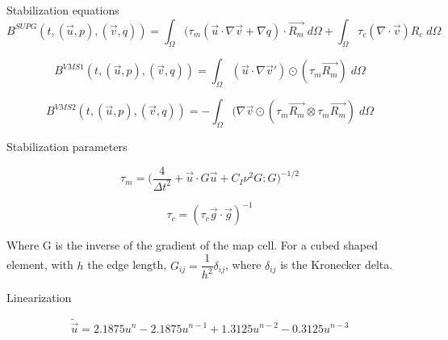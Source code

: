 \begin{frame}{Stabilization equations}
\begin{equation}
B^{SUPG}(t, (\Vec{u},p), (\Vec{v},q))  =     \int_\Omega(\tau_m(\Vec{u}\cdot\nabla \Vec{v} +\nabla q)\cdot\Vec{R_m} \;d\Omega+ \int_\Omega \tau_c (\nabla \cdot \Vec{v})R_c \;d\Omega
\label{equ:bsupg}
\end{equation}

\begin{equation}
B^{VMS1}(t, (\Vec{u},p), (\Vec{v},q))  = \int_\Omega (\Vec{u}\cdot\nabla \Vec{v}')\odot(\tau_m \Vec{R_m}) \;d\Omega
\label{equ:bvms1}
\end{equation}


\begin{equation}
B^{VMS2}(t, (\Vec{u},p), (\Vec{v},q))  = -\int_\Omega (\nabla\Vec{v}\odot(\tau_m \Vec{R_m} \otimes \tau_m \Vec{R_m}) \;d\Omega
\label{equ:bvms2}
\end{equation}

\end{frame}


\begin{frame}{Stabilization parameters}

\begin{equation}
\tau_m =\bigg( \dfrac{4}{\Delta t^2} + \Vec{u}\cdot{G}\Vec{u} + C_I \nu^2 {G}:{G} \bigg)^{-1/2}
\label{equ:taum}
\end{equation}

\begin{equation}
\tau_c = (\tau_c\Vec{g}\cdot\Vec{g})^{-1}
\label{equ:tauc}
\end{equation}

Where G is the inverse of the gradient of the map cell.
For a cubed shaped element, with $h$ the edge length, $G_{ij} =\dfrac{1}{h^2}\delta_{ij}$, where $\delta_{ij}$ is the Kronecker delta.

\end{frame}


\begin{frame}{Linearization}

\begin{equation}
    \tilde{\Vec{u}} = 2.1875 u^{n} - 2.1875 u^{n-1} + 1.3125 u^{n-2} - 0.3125 u^{n-3} 
    \label{equlin:taylor_exp}
\end{equation}

\end{frame}



